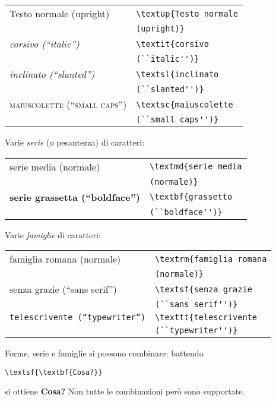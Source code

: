 \begin{center}
\begin{tabular}{ll}
  \textup{Testo normale (upright)} &
    \verb!\textup{Testo normale!\\
    &\qquad\verb!(upright)}!\\ 
  \textit{corsivo (``italic'')} &
    \verb!\textit{corsivo!\\
    &\qquad\verb!(``italic'')}!\\
  \textsl{inclinato (``slanted'')} &
    \verb!\textsl{inclinato!\\
    &\qquad\verb!(``slanted'')}!\\
  \textsc{maiuscolette (``small caps'')} &
    \verb!\textsc{maiuscolette!\\
    &\qquad\verb!(``small caps'')}!
\end{tabular}
\end{center}
%
Varie \emph{serie} (o pesantezza) di caratteri:
%
\begin{center}
\begin{tabular}{ll}
  \textmd{serie media (normale)} &
    \verb!\textmd{serie media!\\
    &\qquad\verb!(normale)}!\\
  \textbf{serie grassetta (``boldface'')} &
    \verb!\textbf{grassetto!\\
    &\qquad\verb!(``boldface'')}!
\end{tabular}
\end{center}
%
Varie \emph{famiglie} di caratteri:
%
\begin{center}
\begin{tabular}{ll}
  \textrm{famiglia romana (normale)} &
    \verb!\textrm{famiglia romana!\\
    &\qquad\verb!(normale)}!\\
  \textsf{senza grazie (``sans serif'')} &
    \verb!\textsf{senza grazie!\\
    &\qquad\verb!(``sans serif'')}!\\
  \texttt{telescrivente (``typewriter'')}&
    \verb!\texttt{telescrivente!\\
    &\qquad\verb!(``typewriter'')}!
\end{tabular}
\end{center}
%
Forme, serie e famiglie si possono combinare: battendo
\begin{center}
  \verb!\textsf{\textbf{Cosa?}}!
\end{center}
si ottiene \textsf{\textbf{Cosa?}} Non tutte le
combinazioni però sono supportate.

